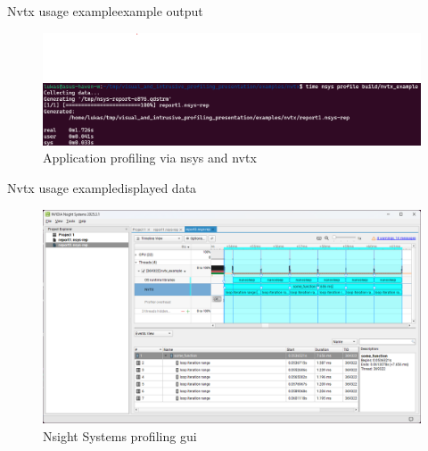 \documentclass[aspectratio=169]{beamer}
\begin{document}
\begin{frame}{Nvtx usage example}{example output}
    \begin{figure}[h]
        \centering
        \includegraphics[width=\textwidth,height=0.7\textheight,keepaspectratio]{pics/nvtx/nsys_example.png}
        \caption{Application profiling via nsys and nvtx}
    \end{figure}

\end{frame}

\begin{frame}{Nvtx usage example}{displayed data}

    \begin{figure}[h]
        \centering
        \includegraphics[width=\textwidth,height=0.7\textheight,keepaspectratio]{pics/nvtx/gui.png}
        \caption{Nsight Systems profiling gui}
    \end{figure}

\end{frame}
\end{document}
